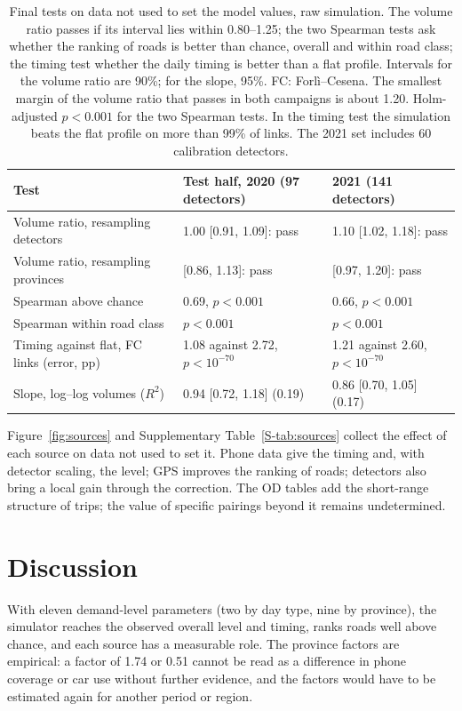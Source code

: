 \documentclass[preprint,11pt,a4paper]{elsarticle}
\begin{document}
\begin{table}[htbp]
\centering
\caption{Final tests on data not used to set the model values, raw simulation. The volume ratio passes if its interval lies within 0.80--1.25; the two Spearman tests ask whether the ranking of roads is better than chance, overall and within road class; the timing test whether the daily timing is better than a flat profile. Intervals for the volume ratio are 90\%; for the slope, 95\%. FC: Forl\`i--Cesena. The smallest margin of the volume ratio that passes in both campaigns is about 1.20. Holm-adjusted $p<0.001$ for the two Spearman tests. In the timing test the simulation beats the flat profile on more than 99\% of links. The 2021 set includes 60 calibration detectors.}
\label{tab:tests}
\begin{tabular}{@{}p{5.8cm}p{4.4cm}p{4.4cm}@{}}
\toprule
Test & Test half, 2020 (97 detectors) & 2021 (141 detectors) \\
\midrule
Volume ratio, resampling detectors & 1.00 [0.91, 1.09]: pass & 1.10 [1.02, 1.18]: pass \\
Volume ratio, resampling provinces & [0.86, 1.13]: pass & [0.97, 1.20]: pass \\
Spearman above chance & 0.69, $p<0.001$ & 0.66, $p<0.001$ \\
Spearman within road class & $p<0.001$ & $p<0.001$ \\
Timing against flat, FC links (error, pp) & 1.08 against 2.72, $p<10^{-70}$ & 1.21 against 2.60, $p<10^{-70}$ \\
Slope, log--log volumes ($R^2$) & 0.94 [0.72, 1.18] (0.19) & 0.86 [0.70, 1.05] (0.17) \\
\bottomrule
\end{tabular}
\end{table}

Figure~\ref{fig:sources} and Supplementary Table~\ref{S-tab:sources} collect the effect of each source on data not used to set it. Phone data give the timing and, with detector scaling, the level; GPS improves the ranking of roads; detectors also bring a local gain through the correction. The OD tables add the short-range structure of trips; the value of specific pairings beyond it remains undetermined.

\section{Discussion}
\label{sec:discussion}
With eleven demand-level parameters (two by day type, nine by province), the simulator reaches the observed overall level and timing, ranks roads well above chance, and each source has a measurable role. The province factors are empirical: a factor of 1.74 or 0.51 cannot be read as a difference in phone coverage or car use without further evidence, and the factors would have to be estimated again for another period or region.
\end{document}
